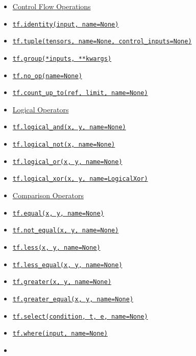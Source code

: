 \begin{itemize}
\tightlist
\item
  \protect\hyperlink{AUTOGENERATED-control-flow-operations}{Control Flow
  Operations}
\item
  \protect\hyperlink{identity}{\texttt{tf.identity(input,\ name=None)}}
\item
  \protect\hyperlink{tuple}{\texttt{tf.tuple(tensors,\ name=None,\ control\_inputs=None)}}
\item
  \protect\hyperlink{group}{\texttt{tf.group(*inputs,\ **kwargs)}}
\item
  \protect\hyperlink{noux5fop}{\texttt{tf.no\_op(name=None)}}
\item
  \protect\hyperlink{countux5fupux5fto}{\texttt{tf.count\_up\_to(ref,\ limit,\ name=None)}}
\item
  \protect\hyperlink{AUTOGENERATED-logical-operators}{Logical Operators}
\item
  \protect\hyperlink{logicalux5fand}{\texttt{tf.logical\_and(x,\ y,\ name=None)}}
\item
  \protect\hyperlink{logicalux5fnot}{\texttt{tf.logical\_not(x,\ name=None)}}
\item
  \protect\hyperlink{logicalux5for}{\texttt{tf.logical\_or(x,\ y,\ name=None)}}
\item
  \protect\hyperlink{logicalux5fxor}{\texttt{tf.logical\_xor(x,\ y,\ name=\textquotesingle{}LogicalXor\textquotesingle{})}}
\item
  \protect\hyperlink{AUTOGENERATED-comparison-operators}{Comparison
  Operators}
\item
  \protect\hyperlink{equal}{\texttt{tf.equal(x,\ y,\ name=None)}}
\item
  \protect\hyperlink{notux5fequal}{\texttt{tf.not\_equal(x,\ y,\ name=None)}}
\item
  \protect\hyperlink{less}{\texttt{tf.less(x,\ y,\ name=None)}}
\item
  \protect\hyperlink{lessux5fequal}{\texttt{tf.less\_equal(x,\ y,\ name=None)}}
\item
  \protect\hyperlink{greater}{\texttt{tf.greater(x,\ y,\ name=None)}}
\item
  \protect\hyperlink{greaterux5fequal}{\texttt{tf.greater\_equal(x,\ y,\ name=None)}}
\item
  \protect\hyperlink{select}{\texttt{tf.select(condition,\ t,\ e,\ name=None)}}
\item
  \protect\hyperlink{where}{\texttt{tf.where(input,\ name=None)}}
\item

\end{itemize}
